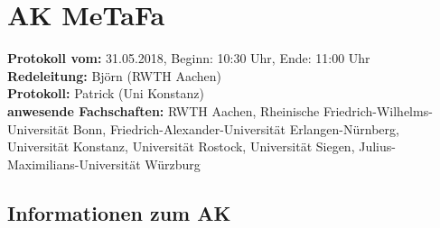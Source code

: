 
\section{AK MeTaFa}

	\textbf{Protokoll vom:} 31.05.2018,
	Beginn: 10:30 Uhr,
	Ende: 11:00 Uhr \\
	\textbf{Redeleitung:} Björn (RWTH Aachen) \\
	\textbf{Protokoll:} Patrick (Uni Konstanz) \\
	\textbf{anwesende Fachschaften:} RWTH Aachen, Rheinische Friedrich-Wilhelms-Universität Bonn, Friedrich-Alexander-Universität Erlangen-Nürnberg, Universität Konstanz, Universität Rostock, Universität Siegen, Julius-Maximilians-Universität Würzburg

	\subsection*{Informationen zum AK}


